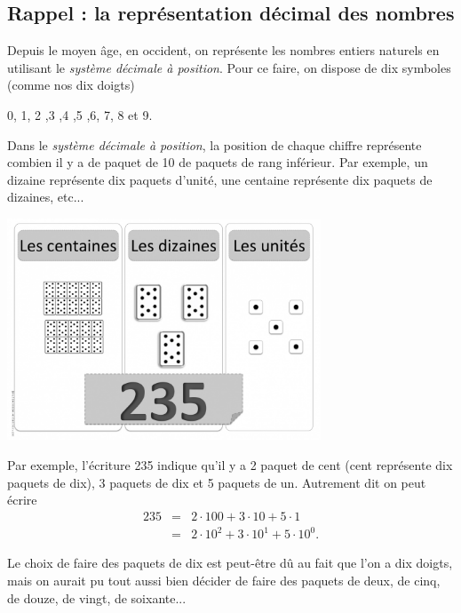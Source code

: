 \subsection{Rappel : la représentation décimal des nombres}
Depuis le moyen âge, en occident, on représente les nombres entiers naturels en utilisant le \textit{système  décimale à position}. Pour ce faire, on dispose de dix symboles (comme nos dix doigts)
\begin{center}
	0, 1, 2 ,3 ,4 ,5 ,6, 7, 8 et 9.
\end{center}
Dans le \textit{système  décimale à position}, la position de chaque chiffre représente combien il y a de paquet de  10 de paquets de rang inférieur. Par exemple, un dizaine représente dix paquets d'unité, une centaine représente dix paquets de dizaines, etc... 
\begin{center}
	\includegraphics[trim=0 0 0 20,width=0.7\textwidth]{Images/intro/systeme_decimal.jpg}
\end{center}
Par exemple, l'écriture 235 indique qu'il y a 2 paquet de cent (cent représente dix paquets de dix), 3 paquets de dix et 5 paquets de un. Autrement dit on peut écrire
\begin{eqnarray*}
	235 &=&2 \cdot 100 + 3\cdot 10 +5 \cdot 1\\
	&=& 2 \cdot 10^2 + 3\cdot 10^1 +5 \cdot 10^0.
\end{eqnarray*}

\begin{eclairage}
Le choix de faire des paquets de dix est peut-être dû au fait que l’on a dix doigts,
mais on aurait pu tout aussi bien décider de faire des paquets de deux, de cinq, de
douze, de vingt, de soixante...
\end{eclairage}
\newpage

